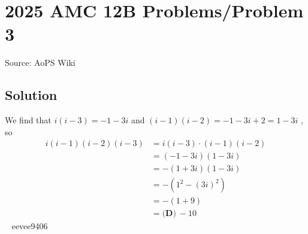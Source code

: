 \documentclass[12pt]{article}
\begin{document}
\section*{{2025 AMC 12B Problems/Problem 3}}
Source: AoPS Wiki

\subsection*{Solution}
We find that $i(i-3)=-1-3i$ and $(i-1)(i-2)=-1-3i+2=1-3i$ , so
\begin{align}
i(i-1)(i-2)(i-3)&=i(i-3)\cdot (i-1)(i-2)\\
&=(-1-3i)(1-3i)\\
&=-(1+3i)(1-3i)\\
&=-(1^2-(3i)^2)\\
&=-(1+9)\\
&=\boxed{\textbf{(D)}~-10 }
\end{align} ~ eevee9406
\end{document}
